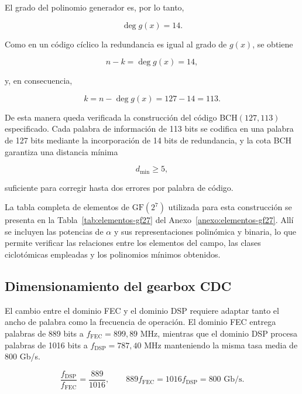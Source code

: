 \documentclass[10pt,a4paper]{article}
\begin{document}
El grado del polinomio generador es, por lo tanto,

\begin{equation}
    \deg g(x)=14.
\end{equation}

Como en un código cíclico la redundancia es igual al grado de $g(x)$, se
obtiene

\begin{equation}
    n-k=\deg g(x)=14,
\end{equation}

y, en consecuencia,

\begin{equation}
    k=n-\deg g(x)=127-14=113.
\end{equation}

De esta manera queda verificada la construcción del código BCH$(127,113)$
especificado. Cada palabra de información de 113 bits se codifica en una
palabra de 127 bits mediante la incorporación de 14 bits de redundancia, y la
cota BCH garantiza una distancia mínima

\begin{equation}
    d_{\min}\geq5,
\end{equation}

suficiente para corregir hasta dos errores por palabra de código.

La tabla completa de elementos de $\mathrm{GF}(2^7)$ utilizada para esta
construcción se presenta en la Tabla~\ref{tab:elementos-gf27} del
Anexo~\ref{anexo:elementos-gf27}. Allí se incluyen las potencias de $\alpha$ y
sus representaciones polinómica y binaria, lo que permite verificar las
relaciones entre los elementos del campo, las clases ciclotómicas empleadas y
los polinomios mínimos obtenidos.

\subsection{Dimensionamiento del gearbox CDC}

El cambio entre el dominio FEC y el dominio DSP requiere adaptar tanto el
ancho de palabra como la frecuencia de operación. El dominio FEC entrega
palabras de 889 bits a $f_{\mathrm{FEC}}=899{,}89$ MHz, mientras que el
dominio DSP procesa palabras de 1016 bits a
$f_{\mathrm{DSP}}=787{,}40$ MHz manteniendo la misma tasa media
de 800 Gb/s.

\begin{equation}
    \frac{f_{\mathrm{DSP}}}{f_{\mathrm{FEC}}}
    =
    \frac{889}{1016},
    \qquad
    889f_{\mathrm{FEC}}
    =
    1016f_{\mathrm{DSP}}
    =
    800\text{ Gb/s}.
    \label{eq:relacion-clocks-gearbox}
\end{equation}
\end{document}
